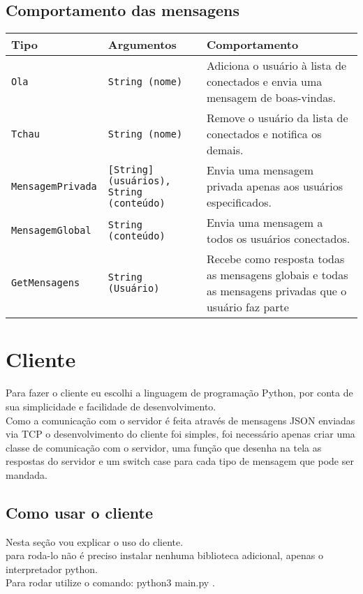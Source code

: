 \documentclass{article}
\begin{document}
{{        \subsection{Comportamento das mensagens}
        {
            \begin{table}[h!]
                \centering
                \begin{tabular}{|p{4.8cm}|p{4.8cm}|p{4.8cm}|}
                    \hline
                    \textbf{Tipo} & \textbf{Argumentos} & \textbf{Comportamento} \\
                    \hline
                    \texttt{Ola} & \texttt{String (nome)} & Adiciona o usuário à lista de conectados e envia uma mensagem de boas-vindas. \\
                    \hline
                    \texttt{Tchau} & \texttt{String (nome)} & Remove o usuário da lista de conectados e notifica os demais. \\
                    \hline
                    \texttt{MensagemPrivada} & \texttt{[String] (usuários), String (conteúdo)} & Envia uma mensagem privada apenas aos usuários especificados. \\
                    \hline
                    \texttt{MensagemGlobal} & \texttt{String (conteúdo)} & Envia uma mensagem a todos os usuários conectados. \\
                    \hline
                    \texttt{GetMensagens} & \texttt{String (Usuário)} & Recebe como resposta todas as mensagens globais e todas as mensagens privadas que o usuário faz parte\\
                    \hline
                \end{tabular}
            \end{table}
        }
    }

    \section{Cliente}
    {
        Para fazer o cliente eu escolhi a linguagem de programação Python, por conta de sua simplicidade e facilidade de desenvolvimento.
        \\Como a comunicação com o servidor é feita através de mensagens JSON enviadas via TCP o desenvolvimento do cliente foi simples, foi necessário apenas criar uma classe de comunicação com o servidor, uma função que desenha na tela as respostas do servidor e um switch case para cada tipo de mensagem que pode ser mandada.
    }
    \subsection{Como usar o cliente}
    {
        Nesta seção vou explicar o uso do cliente.\\
        para roda-lo não é preciso instalar nenhuma biblioteca adicional, apenas o interpretador python. \\
        Para rodar utilize o comando: python3 main.py .\\
}}
\end{document}
